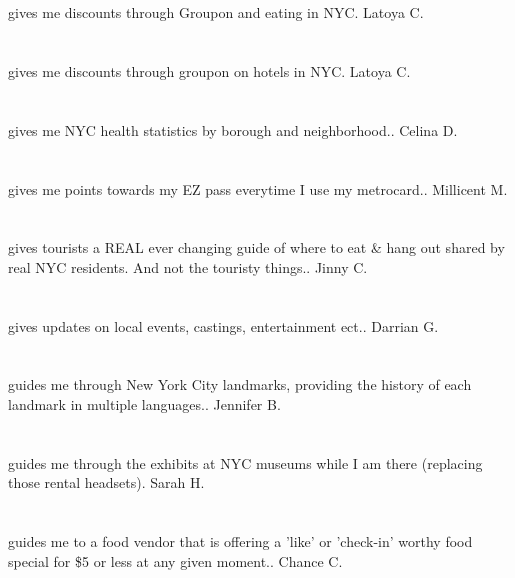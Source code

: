 \section{}gives me discounts through Groupon and  eating in NYC. Latoya C.
\section{}gives me discounts through groupon on hotels in NYC. Latoya C.
\section{}gives me NYC health statistics by borough and neighborhood.. Celina D.
\section{}  gives me points towards my EZ pass everytime I use my metrocard.. Millicent M.
\section{}gives tourists a REAL ever changing guide of where to eat \& hang out shared by real NYC residents. And not the touristy things.. Jinny C.
\section{}gives updates on local events,  castings,  entertainment ect.. Darrian G.
\section{}guides me through New York City landmarks,  providing the history of each landmark in multiple languages.. Jennifer B.
\section{}guides me through the exhibits at NYC museums while I am there (replacing those rental headsets). Sarah H.
\section{}guides me to a food vendor that is offering a 'like' or 'check-in' worthy food special for \$5 or less at any given moment.. Chance C.
